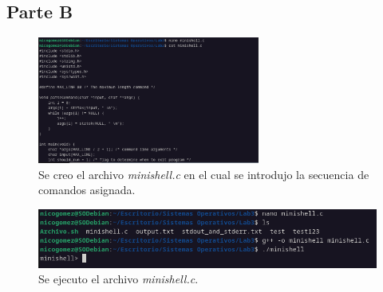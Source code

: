 \documentclass{templateNote}
\begin{document}
\newpage
\subsection*{Parte B}
\begin{figure}[H]
    \centering 
    \includegraphics[width=0.65\textwidth]{img/ejerc5part1.png}
    \\Se creo el archivo \textit{minishell.c} en el cual se introdujo la secuencia de comandos asignada. 
\end{figure}
\begin{figure}[H]
    \centering
    \includegraphics[width=\textwidth]{img/ejerc5part2.png}
    \\Se ejecuto el archivo \textit{minishell.c}.
\end{figure}
\end{document}
